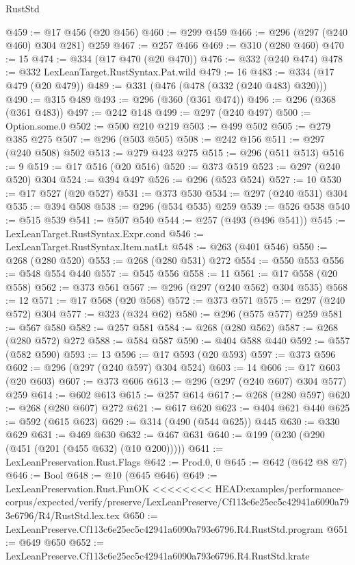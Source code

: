 \begin{lexlean}{RustStd}
\begin{coremodule}
{\begin{coremodule}
{{{{{{{@459 := @17 @456 (@20 @456)
@460 := @299 @459
@466 := @296 (@297 (@240 @460) @304 @281) @259
@467 := @257 @466
@469 := @310 (@280 @460)
@470 := 15
@474 := @334 (@17 @470 (@20 @470))
@476 := @332 (@240 @474)
@478 := @332 LexLeanTarget.RustSyntax.Pat.wild
@479 := 16
@483 := @334 (@17 @479 (@20 @479))
@489 := @331 (@476 (@478 (@332 (@240 @483) @320)))
@490 := @315 @489
@493 := @296 (@360 (@361 @474))
@496 := @296 (@368 (@361 @483))
@497 := @242 @148
@499 := @297 (@240 @497)
@500 := Option.some.{0}
@502 := @500 @210 @219
@503 := @499 @502
@505 := @279 @385 @275
@507 := @296 (@503 @505)
@508 := @242 @156
@511 := @297 (@240 @508) @502
@513 := @279 @423 @275
@515 := @296 (@511 @513)
@516 := 9
@519 := @17 @516 (@20 @516)
@520 := @373 @519
@523 := @297 (@240 @520) @304
@524 := @394 @497
@526 := @296 (@523 @524)
@527 := 10
@530 := @17 @527 (@20 @527)
@531 := @373 @530
@534 := @297 (@240 @531) @304
@535 := @394 @508
@538 := @296 (@534 @535) @259
@539 := @526 @538
@540 := @515 @539
@541 := @507 @540
@544 := @257 (@493 (@496 @541))
@545 := LexLeanTarget.RustSyntax.Expr.cond
@546 := LexLeanTarget.RustSyntax.Item.natLt
@548 := @263 (@401 @546)
@550 := @268 (@280 @520)
@553 := @268 (@280 @531) @272
@554 := @550 @553
@556 := @548 @554 @440
@557 := @545 @556
@558 := 11
@561 := @17 @558 (@20 @558)
@562 := @373 @561
@567 := @296 (@297 (@240 @562) @304 @535)
@568 := 12
@571 := @17 @568 (@20 @568)
@572 := @373 @571
@575 := @297 (@240 @572) @304
@577 := @323 (@324 @62)
@580 := @296 (@575 @577) @259
@581 := @567 @580
@582 := @257 @581
@584 := @268 (@280 @562)
@587 := @268 (@280 @572) @272
@588 := @584 @587
@590 := @404 @588 @440
@592 := @557 (@582 @590)
@593 := 13
@596 := @17 @593 (@20 @593)
@597 := @373 @596
@602 := @296 (@297 (@240 @597) @304 @524)
@603 := 14
@606 := @17 @603 (@20 @603)
@607 := @373 @606
@613 := @296 (@297 (@240 @607) @304 @577) @259
@614 := @602 @613
@615 := @257 @614
@617 := @268 (@280 @597)
@620 := @268 (@280 @607) @272
@621 := @617 @620
@623 := @404 @621 @440
@625 := @592 (@615 @623)
@629 := @314 (@490 (@544 @625)) @445
@630 := @330 @629
@631 := @469 @630
@632 := @467 @631
@640 := @199 (@230 (@290 (@451 (@201 (@455 @632) (@10 @200)))))
@641 := LexLeanPreservation.Rust.Flags
@642 := Prod.{0, 0}
@645 := @642 (@642 @8 @7)
@646 := Bool
@648 := @10 (@645 @646)
@649 := LexLeanPreservation.Rust.FunOK
<<<<<<<< HEAD:examples/performance-corpus/expected/verify/preserve/LexLeanPreserve/Cf113c6e25ec5c42941a6090a793e6796/R4/RustStd.lex.tex
@650 := LexLeanPreserve.Cf113c6e25ec5c42941a6090a793e6796.R4.RustStd.program
@651 := @649 @650
@652 := LexLeanPreserve.Cf113c6e25ec5c42941a6090a793e6796.R4.RustStd.krate
}}}}}}}
\end{coremodule}}
\end{coremodule}
\end{lexlean}
